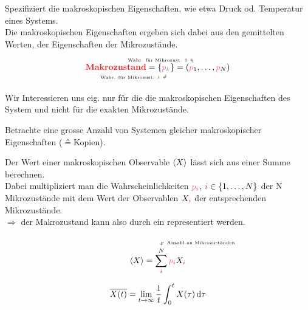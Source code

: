 \begin{defnbox}\nospacing
  \begin{defn}[Makrozustand]
    Spezifiziert die makroskopischen Eigenschaften, wie etwa Druck od. Temperatur eines Systems.\\
    Die makroskopischen Eigenschaften ergeben sich dabei aus den gemittelten Werten, der Eigenschaften der Mikrozustände.
    \begin{align*}
      \text{\rdb{Makrozustand}}=\{\bdla{\pb_{\idxk}}{\normalfont{Wahr. für Mikrozust. }\idxk}\}=(\tula{\pb_1}{\normalfont{Wahr. für Mikrozust. 1}},\ldots,\pb_N) 
    \end{align*}
  \end{defn}
\end{defnbox}
\begin{sectionbox}[Idee]\nospacing
  Wir Interessieren uns eig. nur für die die makroskopischen Eigenschaften des System und nicht für die exakten Mikrozustände.
\end{sectionbox}
\begin{defnbox}\nospacing
  \begin{defn}[Ensemble]
    Betrachte eine grosse Anzahl von Systemen gleicher makroskopischer Eigenschaften ($\corresponds$Kopien).
  \end{defn}
\end{defnbox}
\begin{sectionbox}\nospacing
    Der Wert einer makroskopischen Observable $\left\langle X\right\rangle$ lässt sich aus einer Summe berechnen.\\
    Dabei multipliziert man die Wahrscheinlichkeiten $\pb_{\idxi}$, $\idxi\in\{1,\ldots,N\}$ der N Mikrozustände mit dem Wert der
    Observablen $X_{\idxi}$ der entsprechenden Mikrozustände.\\
    $\Rightarrow$ der Makrozustand kann also durch ein  representiert werden.
\end{sectionbox}
\begin{defnbox}\nospacing
  \begin{defn}
    \begin{align}
      \obs{X}=\sum_{\idxi}^{\tura{N}{\normalfont{Anzahl an Mikrozuständen}}}\pb_{\idxi}X_{\idxi}\label{eq:ensembelDurchschnitt}
    \end{align}
  \end{defn}
\end{defnbox}
\begin{defnbox}\nospacing
  \begin{defn}[Zeitmittel]
    \begin{align}
      \overline{X(t)}=\lim_{t\to\infty}\frac{1}{t}\int_{0}^t X(\tau)\diff\tau
    \end{align}
  \end{defn}
\end{defnbox}
